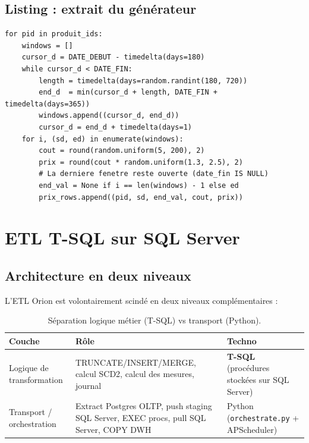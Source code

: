 \documentclass[11pt,a4paper]{article}
\newcommand{\code}[1]{\texttt{\small #1}}
\begin{document}
\subsection{Listing : extrait du générateur}

\begin{lstlisting}[style=py,caption={Génération des prix historisés},label={lst:gen-prices}]
for pid in produit_ids:
    windows = []
    cursor_d = DATE_DEBUT - timedelta(days=180)
    while cursor_d < DATE_FIN:
        length = timedelta(days=random.randint(180, 720))
        end_d  = min(cursor_d + length, DATE_FIN + timedelta(days=365))
        windows.append((cursor_d, end_d))
        cursor_d = end_d + timedelta(days=1)
    for i, (sd, ed) in enumerate(windows):
        cout = round(random.uniform(5, 200), 2)
        prix = round(cout * random.uniform(1.3, 2.5), 2)
        # La derniere fenetre reste ouverte (date_fin IS NULL)
        end_val = None if i == len(windows) - 1 else ed
        prix_rows.append((pid, sd, end_val, cout, prix))
\end{lstlisting}

\newpage
\section{ETL T-SQL sur SQL Server}
\label{sec:etl}

\subsection{Architecture en deux niveaux}

L'ETL Orion est volontairement scindé en deux niveaux complémentaires :

\begin{table}[h]
\centering\small
\begin{tabularx}{\textwidth}{l X l}\toprule
\textbf{Couche}                  & \textbf{Rôle}                                            & \textbf{Techno}\\\midrule
Logique de transformation        & TRUNCATE/INSERT/MERGE, calcul SCD2, calcul des mesures, journal & \textbf{T-SQL} (procédures stockées sur SQL Server) \\
Transport / orchestration        & Extract Postgres OLTP, push staging SQL Server, EXEC procs, pull SQL Server, COPY DWH & Python (\code{orchestrate.py} + APScheduler)\\\bottomrule
\end{tabularx}
\caption{Séparation logique métier (T-SQL) vs transport (Python).}
\end{table}
\end{document}
